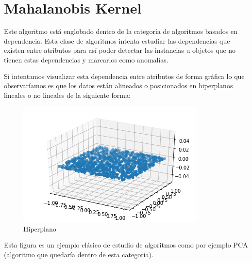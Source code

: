 \section{Mahalanobis Kernel}

Este algoritmo está englobado dentro de la categoría de algoritmos basados en dependencia. Esta clase de algoritmos intenta estudiar las dependencias que existen entre atributos para así poder detectar las instancias u objetos que no tienen estas dependencias y marcarlos como anomalías.

Si intentamos visualizar esta dependencia entre atributos de forma gráfica lo que observaríamos es que los datos están alineados o posicionados en hiperplanos lineales o no lineales de la siguiente forma:

\begin{figure}[H]
	\centering
	\label{hiperplano}
	\includegraphics[scale=0.8]{imagenes/hiperplano}
	\caption{Hiperplano}
\end{figure}

Esta figura es un ejemplo clásico de estudio de algoritmos como por ejemplo PCA (algoritmo que quedaría dentro de esta categoría).

